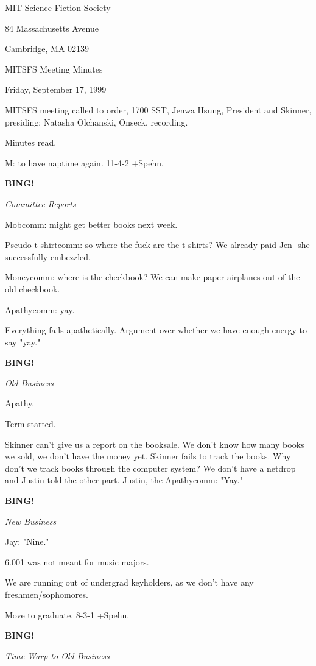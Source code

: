 \documentclass[12pt]{article}
\newcommand{\bing}{{\bf BING!} }
\newcommand{\goto}[1]{\bing \vskip 12pt \centerline{{\em{#1}}}}
\begin{document}
\begin{center}

MIT Science Fiction Society 

84 Massachusetts Avenue

Cambridge, MA 02139

\vspace{12pt}

MITSFS Meeting Minutes 

Friday, September 17, 1999

\end{center}
 
\vspace{18pt}

\setlength{\parskip}{6pt}

\noindent
MITSFS meeting called to order, 1700 SST,
Jenwa Hsung, President and Skinner, presiding; Natasha Olchanski, Onseck, recording.

Minutes read.

M: to have naptime again. 11-4-2 +Spehn.

\goto{Committee Reports}

Mobcomm: might get better books next week.

Pseudo-t-shirtcomm: so where the fuck are the t-shirts? We already paid Jen- she successfully embezzled.

Moneycomm: where is the checkbook? We can make paper airplanes out of the old checkbook.

Apathycomm: yay.

Everything fails apathetically. Argument over whether we have enough energy to say "yay."

\goto{Old Business}

Apathy.

Term started.

Skinner can't give us a report on the booksale. We don't know how many books we sold, we don't have the money yet. Skinner fails to track the books. Why don't we track books through the computer system? We don't have a netdrop and Justin told the other part. Justin, the Apathycomm: "Yay."

\goto{New Business}

Jay: "Nine."

6.001 was not meant for music majors.

We are running out of undergrad keyholders, as we don't have any freshmen/sophomores.

Move to graduate. 8-3-1 +Spehn.

\goto{Time Warp to Old Business}
\end{document}
